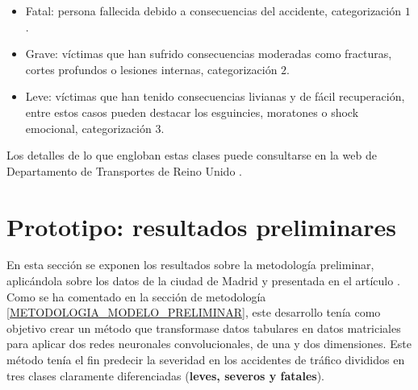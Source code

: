 \documentclass{uathesis-es}
\begin{document}
{\begin{itemize}
    \item Fatal: persona fallecida debido a consecuencias del accidente, categorización $1$.
    \item Grave: víctimas que han sufrido consecuencias moderadas como fracturas, cortes profundos o lesiones internas, categorización $2$.
    \item Leve: víctimas que han tenido consecuencias livianas y de fácil recuperación, entre estos casos pueden destacar los esguincies, moratones o shock emocional, categorización $3$.
\end{itemize}

Los detalles de lo que engloban estas clases puede consultarse en la web de Departamento de Transportes de Reino Unido \cite{UKDepartmentSeverityDefinition}.



\section{Prototipo: resultados preliminares}






En esta sección se exponen los resultados sobre la metodología preliminar, aplicándola sobre los datos de la ciudad de Madrid y presentada en el artículo \cite{PEREZSALA2023113245}. Como se ha comentado en la sección de metodología \ref{METODOLOGIA_MODELO_PRELIMINAR}, este desarrollo tenía como objetivo crear un método que transformase datos tabulares en datos matriciales para aplicar dos redes neuronales convolucionales, de una y dos dimensiones. Este método tenía el fin predecir la severidad en los accidentes de tráfico divididos en tres clases claramente diferenciadas (\textbf{leves, severos y fatales}). 

}
\end{document}

